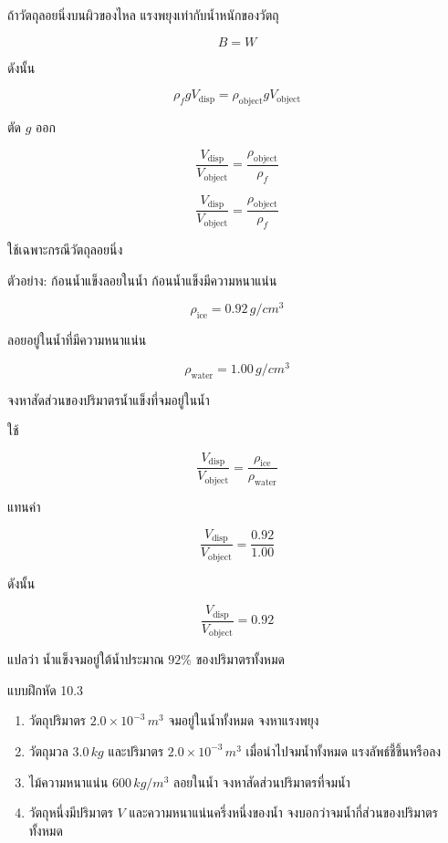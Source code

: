 ถ้าวัตถุลอยนิ่งบนผิวของไหล แรงพยุงเท่ากับน้ำหนักของวัตถุ

\[
B=W
\]

ดังนั้น

\[
\rho_f gV_{\text{disp}}=\rho_{\text{object}}gV_{\text{object}}
\]

ตัด $g$ ออก

\[
\frac{V_{\text{disp}}}{V_{\text{object}}}
=
\frac{\rho_{\text{object}}}{\rho_f}
\]

\begin{tcolorbox}[title=เศษส่วนของวัตถุที่จมน้ำเมื่อวัตถุลอยนิ่ง]
\[
\frac{V_{\text{disp}}}{V_{\text{object}}}
=
\frac{\rho_{\text{object}}}{\rho_f}
\]

ใช้เฉพาะกรณีวัตถุลอยนิ่ง
\end{tcolorbox}

\begin{examplebox}{ตัวอย่าง: ก้อนน้ำแข็งลอยในน้ำ}
ก้อนน้ำแข็งมีความหนาแน่น

\[
\rho_{\text{ice}}=0.92\,\si{g/cm^3}
\]

ลอยอยู่ในน้ำที่มีความหนาแน่น

\[
\rho_{\text{water}}=1.00\,\si{g/cm^3}
\]

จงหาสัดส่วนของปริมาตรน้ำแข็งที่จมอยู่ในน้ำ

ใช้

\[
\frac{V_{\text{disp}}}{V_{\text{object}}}
=
\frac{\rho_{\text{ice}}}{\rho_{\text{water}}}
\]

แทนค่า

\[
\frac{V_{\text{disp}}}{V_{\text{object}}}
=
\frac{0.92}{1.00}
\]

ดังนั้น

\[
\frac{V_{\text{disp}}}{V_{\text{object}}}=0.92
\]

แปลว่า น้ำแข็งจมอยู่ใต้น้ำประมาณ $92\%$ ของปริมาตรทั้งหมด
\end{examplebox}

\begin{exercisebox}{แบบฝึกหัด 10.3}
\begin{enumerate}
    \item วัตถุปริมาตร $2.0\times 10^{-3}\,\si{m^3}$ จมอยู่ในน้ำทั้งหมด จงหาแรงพยุง
    \item วัตถุมวล $3.0\,\si{kg}$ และปริมาตร $2.0\times 10^{-3}\,\si{m^3}$ เมื่อนำไปจมน้ำทั้งหมด แรงลัพธ์ชี้ขึ้นหรือลง
    \item ไม้ความหนาแน่น $600\,\si{kg/m^3}$ ลอยในน้ำ จงหาสัดส่วนปริมาตรที่จมน้ำ
    \item วัตถุหนึ่งมีปริมาตร $V$ และความหนาแน่นครึ่งหนึ่งของน้ำ จงบอกว่าจมน้ำกี่ส่วนของปริมาตรทั้งหมด
\end{enumerate}
\end{exercisebox}

